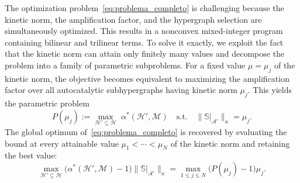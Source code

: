 \documentclass[a4paper,11pt,reqno]{amsart}
\begin{document}
The optimization problem~\eqref{eq:problema_completo} is challenging because
the kinetic norm, the amplification factor, and the hypergraph selection are
simultaneously optimized. This results in a nonconvex mixed-integer program
containing bilinear and trilinear terms. To solve it exactly, we exploit the
fact that the kinetic norm can attain only finitely many values and decompose
the problem into a family of parametric subproblems. For a fixed value $\mu=\mu_j$ of the kinetic norm, the objective becomes
equivalent to maximizing the amplification factor over all autocatalytic
subhypergraphs having kinetic norm $\mu_j$. This yields the parametric problem
\begin{equation}
  P(\mu_j) :=
  \max_{\mathcal H'\subseteq\mathcal H}\;\alpha^*(\mathcal H',\mathcal M)
  \quad\text{s.t.}\quad
  \|\mathbb S|_{\mathcal A'}\|_{\kappa}=\mu_j .
  \label{eq:parametrico}
\end{equation}
The global optimum of~\eqref{eq:problema_completo} is recovered by evaluating the bound at every attainable value $\mu_1<\cdots<\mu_N$ of the kinetic norm and retaining the best value:
\begin{equation}
  \max_{\mathcal H'\subseteq\mathcal H}
  \bigl(\alpha^*(\mathcal H',\mathcal M)-1\bigr)
  \|\mathbb S|_{\mathcal A'}\|_{\kappa}
  =
  \max_{1\le j\le N}
  \bigl(P(\mu_j)-1\bigr)\mu_j .
  \label{eq:barrido-optimo}
\end{equation}
\end{document}
